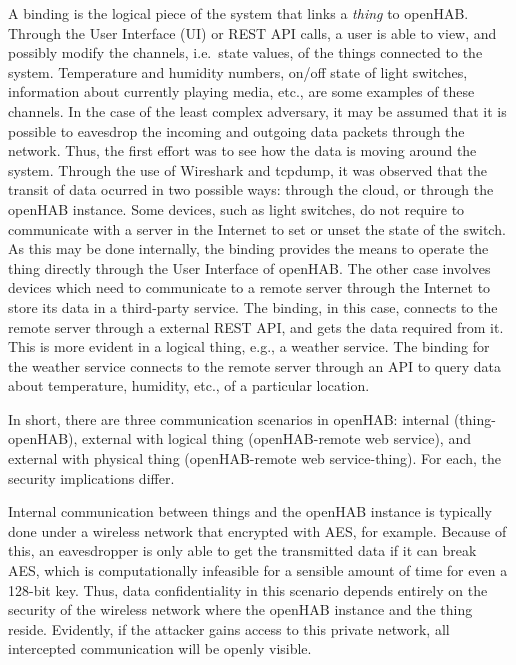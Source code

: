 \documentclass[12pt]{article}
\begin{document}
A binding is the logical piece of the system that links a \emph{thing} to openHAB. Through the User Interface (UI) or REST API calls, a user is able to view, and possibly modify the channels, i.e.\ state values, of the things connected to the system. Temperature and humidity numbers, on/off state of light switches, information about currently playing media, etc., are some examples of these channels. In the case of the least complex adversary, it may be assumed that it is possible to eavesdrop the incoming and outgoing data packets through the network. Thus, the first effort was to see how the data is moving around the system. Through the use of Wireshark and tcpdump, it was observed that the transit of data ocurred in two possible ways: through the cloud, or through the openHAB instance. Some devices, such as light switches, do not require to communicate with a server in the Internet to set or unset the state of the switch. As this may be done internally, the binding provides the means to operate the thing directly through the User Interface of openHAB. The other case involves devices which need to communicate to a remote server through the Internet to store its data in a third-party service. The binding, in this case, connects to the remote server through a external REST API, and gets the data required from it. This is more evident in a logical thing, e.g., a weather service. The binding for the weather service connects to the remote server through an API to query data about temperature, humidity, etc., of a particular location.

In short, there are three communication scenarios in openHAB: internal (thing-openHAB), external with logical thing (openHAB-remote web service), and external with physical thing (openHAB-remote web service-thing). For each, the security implications differ.

Internal communication between things and the openHAB instance is typically done under a wireless network that encrypted with AES, for example. Because of this, an eavesdropper is only able to get the transmitted data if it can break AES, which is computationally infeasible for a sensible amount of time for even a 128-bit key. Thus, data confidentiality in this scenario depends entirely on the security of the wireless network where the openHAB instance and the thing reside. Evidently, if the attacker gains access to this private network, all intercepted communication will be openly visible.
\end{document}
